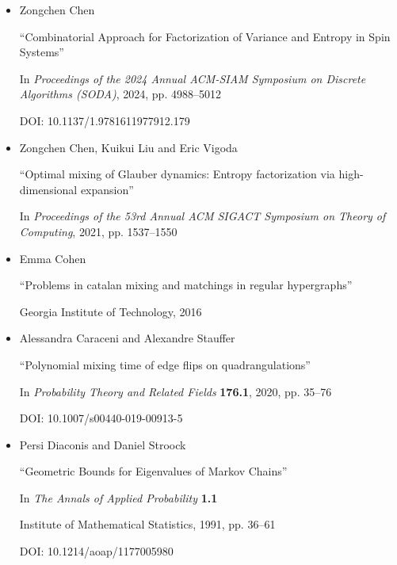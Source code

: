 \documentclass[10pt,a4paper]{article}
\begin{document}
\begin{itemize}
“A lower bound for the smallest eigenvalue of the Laplacian”

In \emph{Problems in analysis}

Princeton University Press, 2015, pp. 195–200


      

\item[] [Che24]
Zongchen Chen

“Combinatorial Approach for Factorization of Variance and Entropy in Spin Systems”

In \emph{Proceedings of the 2024 Annual ACM-SIAM Symposium on Discrete Algorithms (SODA)}, 2024, pp. 4988–5012

DOI: 10.1137/1.9781611977912.179


      

\item[] [CLV21]
Zongchen Chen, Kuikui Liu and Eric Vigoda

“Optimal mixing of Glauber dynamics: Entropy factorization via high-dimensional expansion”

In \emph{Proceedings of the 53rd Annual ACM SIGACT Symposium on Theory of Computing}, 2021, pp. 1537–1550


      

\item[] [Coh16]
Emma Cohen

“Problems in catalan mixing and matchings in regular hypergraphs”

Georgia Institute of Technology, 2016


      

\item[] [CS20]
Alessandra Caraceni and Alexandre Stauffer

“Polynomial mixing time of edge flips on quadrangulations”

In \emph{Probability Theory and Related Fields} \textbf{176.1}, 2020, pp. 35–76

DOI: 10.1007/s00440-019-00913-5


      

\item[] [DS91]
Persi Diaconis and Daniel Stroock

“Geometric Bounds for Eigenvalues of Markov Chains”

In \emph{The Annals of Applied Probability} \textbf{1.1}

Institute of Mathematical Statistics, 1991, pp. 36–61

DOI: 10.1214/aoap/1177005980



\end{itemize}
\end{document}
